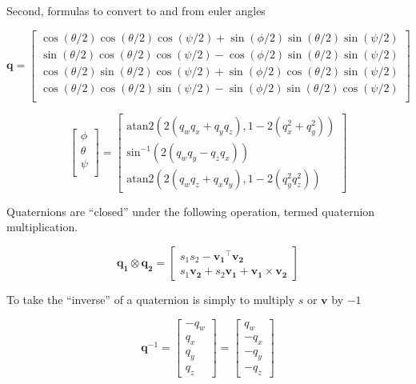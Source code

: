 \documentclass[paper=a4, fontsize=11pt]{scrartcl} %
\numberwithin{equation}{section} %
\numberwithin{figure}{section} %
\numberwithin{table}{section} %
\begin{document}
Second, formulas to convert to and from euler angles


\begin{equation}
	\bm{q} = 
	  \begin{bmatrix}
	  	\cos(\theta/2)\cos(\theta/2)\cos(\psi/2) + \sin(\phi/2)\sin(\theta/2)\sin(\psi/2) \\
	  	\sin(\theta/2)\cos(\theta/2)\cos(\psi/2) - \cos(\phi/2)\sin(\theta/2)\sin(\psi/2) \\
	  	\cos(\theta/2)\sin(\theta/2)\cos(\psi/2) + \sin(\phi/2)\cos(\theta/2)\sin(\psi/2) \\
	  	\cos(\theta/2)\cos(\theta/2)\sin(\psi/2) - \sin(\phi/2)\sin(\theta/2)\cos(\psi/2) \\
	  \end{bmatrix}
\end{equation}

\begin{equation}
	\begin{bmatrix}
		\phi \\
		\theta \\
		\psi \\
	\end{bmatrix}
	=
	\begin{bmatrix}
		\textrm{atan2}\left( 2\left(q_wq_x + q_yq_z\right),1-2\left(q_x^2+q_y^2\right) \right) \\
		\textrm{sin}^{-1}\left( 2 \left( q_wq_y - q_zq_x \right)  \right) \\
		\textrm{atan2}\left( 2 \left( q_wq_z + q_xq_y \right), 1 - 2 \left( q_y^2 q_z^2 \right)  \right) 
	\end{bmatrix}
	\label{eq:euler_from_quat}
\end{equation}

Quaternions are ``closed'' under the following operation, termed quaternion multiplication.

\begin{equation}
	\bm{q_1} \otimes \bm{q_2} = \begin{bmatrix}
									s_1s_2 - \bm{v_1}^\top\bm{v_2} \\
									s_1\bm{v_2} + s_2\bm{v_1} + \bm{v_1} \times \bm{v_2}
								\end{bmatrix}
\end{equation}

To take the ``inverse'' of a quaternion is simply to multiply $s$ or $\bm{v}$ by $-1$

\begin{equation}
	\bm{q}^{-1} = \begin{bmatrix}
				-q_w \\
				q_x \\
				q_y \\
				q_z 
			 \end{bmatrix} 
			 	= \begin{bmatrix}
				q_w \\
				-q_x \\
				-q_y \\
				-q_z 
			 \end{bmatrix} 
\end{equation}
\end{document}
